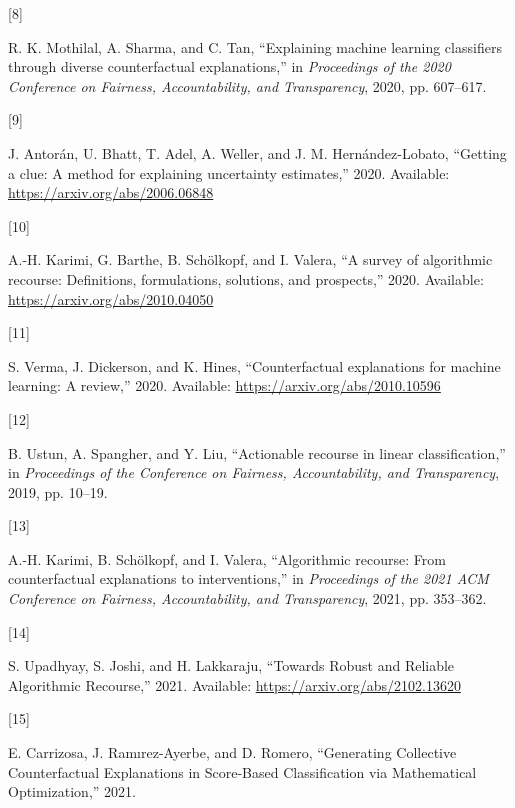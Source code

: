 \documentclass[conference,final,]{IEEEtran}
\newlength{\cslhangindent}
\newlength{\csllabelwidth}
\newlength{\cslentryspacingunit} %
\newenvironment{CSLReferences}[2] %
 {%
  \setlength{\parindent}{0pt}
  \ifodd #1
  \let\oldpar\par
  \def\par{\hangindent=\cslhangindent\oldpar}
  \fi
  \setlength{\parskip}{#2\cslentryspacingunit}
 }%
 {}
\newcommand{\CSLLeftMargin}[1]{\parbox[t]{\csllabelwidth}{#1}}
\newcommand{\CSLRightInline}[1]{\parbox[t]{\linewidth - \csllabelwidth}{#1}\break}
\theoremstyle{definition}
\theoremstyle{definition}
\theoremstyle{definition}
\theoremstyle{definition}
\theoremstyle{remark}
\begin{document}
\begin{CSLReferences}{0}{0}
\leavevmode{}%
\CSLLeftMargin{{[}8{]} }%
\CSLRightInline{R. K. Mothilal, A. Sharma, and C. Tan, {``Explaining machine learning classifiers through diverse counterfactual explanations,''} in \emph{Proceedings of the 2020 {Conference} on {Fairness}, {Accountability}, and {Transparency}}, 2020, pp. 607--617.}

\leavevmode{}%
\CSLLeftMargin{{[}9{]} }%
\CSLRightInline{J. Antorán, U. Bhatt, T. Adel, A. Weller, and J. M. Hernández-Lobato, {``Getting a clue: {A} method for explaining uncertainty estimates,''} 2020. Available: \url{https://arxiv.org/abs/2006.06848}}

\leavevmode{}%
\CSLLeftMargin{{[}10{]} }%
\CSLRightInline{A.-H. Karimi, G. Barthe, B. Schölkopf, and I. Valera, {``A survey of algorithmic recourse: Definitions, formulations, solutions, and prospects,''} 2020. Available: \url{https://arxiv.org/abs/2010.04050}}

\leavevmode{}%
\CSLLeftMargin{{[}11{]} }%
\CSLRightInline{S. Verma, J. Dickerson, and K. Hines, {``Counterfactual explanations for machine learning: {A} review,''} 2020. Available: \url{https://arxiv.org/abs/2010.10596}}

\leavevmode{}%
\CSLLeftMargin{{[}12{]} }%
\CSLRightInline{B. Ustun, A. Spangher, and Y. Liu, {``Actionable recourse in linear classification,''} in \emph{Proceedings of the {Conference} on {Fairness}, {Accountability}, and {Transparency}}, 2019, pp. 10--19.}

\leavevmode{}%
\CSLLeftMargin{{[}13{]} }%
\CSLRightInline{A.-H. Karimi, B. Schölkopf, and I. Valera, {``Algorithmic recourse: From counterfactual explanations to interventions,''} in \emph{Proceedings of the 2021 {ACM Conference} on {Fairness}, {Accountability}, and {Transparency}}, 2021, pp. 353--362.}

\leavevmode{}%
\CSLLeftMargin{{[}14{]} }%
\CSLRightInline{S. Upadhyay, S. Joshi, and H. Lakkaraju, {``Towards {Robust} and {Reliable Algorithmic Recourse},''} 2021. Available: \url{https://arxiv.org/abs/2102.13620}}

\leavevmode{}%
\CSLLeftMargin{{[}15{]} }%
\CSLRightInline{E. Carrizosa, J. Ramırez-Ayerbe, and D. Romero, {``Generating {Collective Counterfactual Explanations} in {Score-Based Classification} via {Mathematical Optimization},''} 2021.}


\end{CSLReferences}
\end{document}
